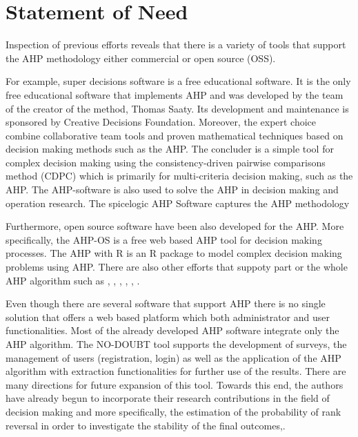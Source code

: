 \documentclass{article}
\begin{document}
\section*{Statement of Need}
Inspection of previous efforts reveals that there is a variety of tools that support the AHP methodology either commercial or open source (OSS). 

For example, super decisions software \citep{Superdecisions} is a free educational software. It is the only free educational software that implements AHP and was developed by the team of the creator of the method, Thomas Saaty. Its development and maintenance is sponsored by Creative Decisions Foundation.
Moreover, the expert choice \citep{Expertchoice} combine collaborative team tools and proven mathematical techniques based on decision making methods such as the AHP. 
The concluder \citep{Concluder} is a simple tool for complex decision making using the consistency-driven pairwise comparisons method (CDPC) which is primarily for multi-criteria decision making, such as the AHP. 
The AHP-software \citep{AHP-Software} is also used to solve the AHP in decision making and operation research. The spicelogic AHP Software \citep{AHP_Software}  captures the AHP methodology

Furthermore, open source software have been also developed for the AHP. More specifically,  the AHP-OS \citep{AHP-OS} is a free web based AHP tool for decision making processes. 
The AHP with R \citep{AHP-R} is an R package to model complex decision making problems using AHP. There are also other efforts that suppoty part or the whole AHP algorithm such as  \citep{Paulgovan}, \citep{Andrugo}, \citep{Airiyu}, \citep{Humberoroa}, \citep{Pvlhx}, \citep{Hogivano}. 

Even though there are several software that support AHP there is no single solution that offers a web based platform which both administrator and user functionalities. Most of the already developed AHP software integrate only the AHP algorithm. The NO-DOUBT tool supports the development of surveys, the management of users (registration, login) as well as the application of the AHP algorithm with extraction functionalities for further use of the results. There are many directions for future expansion of this tool. Towards this end, the authors have already begun to incorporate their research contributions in the field of decision making and more specifically, the estimation of the probability of rank reversal in order to investigate the stability of the final outcomes\citep{dede2015convergence},\citep{dede2016theoretical}.
\end{document}

